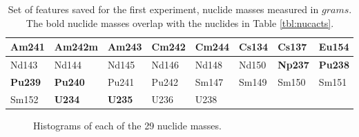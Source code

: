 \begin{table}[!htb]
  \centering
  \begin{tabular}{@{}|l|l|l|l|l|l|l|l|@{}}
    \hline
    \textbf{Am241}&Am242m        &\textbf{Am243}&Cm242&\textbf{Cm244}&\textbf{Cs134}&\textbf{Cs137}&\textbf{Eu154} \\ \hline
    Nd143         &Nd144         &Nd145         &Nd146&Nd148         &Nd150         &\textbf{Np237}&\textbf{Pu238} \\ \hline
    \textbf{Pu239}&\textbf{Pu240}&Pu241         &Pu242&Sm147         &Sm149         &Sm150         &Sm151          \\ \hline
    Sm152         &\textbf{U234} &\textbf{U235} &U236 &U238          &              &              &               \\ \hline
  \end{tabular}
  \caption{Set of features saved for the first experiment, nuclide masses 
           measured in $grams$. The bold nuclide masses overlap with the 
           nuclides in Table \ref{tbl:nucacts}.}
  \label{tbl:nucmass}
\end{table}


\begin{figure}[!htb]
  \caption{Histograms of each of the 29 nuclide masses.}
  \label{fig:nucshist}
\end{figure}

